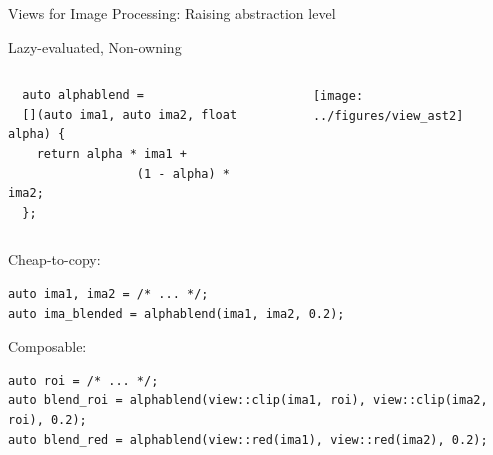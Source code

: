 \documentclass[12pt,aspectratio=169]{beamer}
\begin{document}
\begin{frame}[fragile]{Views for Image Processing: Raising abstraction level}
  \begin{alertblock}{Lazy-evaluated, Non-owning}
    \vspace{0.5cm}
    \begin{columns}[T,onlytextwidth]
      \begin{tcolorbox}
        \begin{verbatim}
  auto alphablend =
  [](auto ima1, auto ima2, float alpha) {
    return alpha * ima1 +
                  (1 - alpha) * ima2;
  };
      \end{verbatim}
      \end{tcolorbox}

      \centering
      \begin{tcolorbox}
        \begin{figure}
          \texttt{[image: ../figures/view\_ast2]}
        \end{figure}
      \end{tcolorbox}

    \end{columns}
  \end{alertblock}

  \begin{alertblock}{Cheap-to-copy:}
    \begin{verbatim}
auto ima1, ima2 = /* ... */;
auto ima_blended = alphablend(ima1, ima2, 0.2);
    \end{verbatim}
  \end{alertblock}

  \begin{alertblock}{Composable:}
    \begin{verbatim}
auto roi = /* ... */;
auto blend_roi = alphablend(view::clip(ima1, roi), view::clip(ima2, roi), 0.2);
auto blend_red = alphablend(view::red(ima1), view::red(ima2), 0.2);
    \end{verbatim}
  \end{alertblock}

\end{frame}
\end{document}
